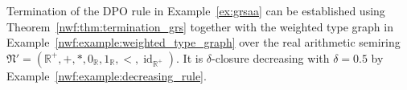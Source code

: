\begin{example}
    \label{nwf:example:termination}
    Termination of the DPO rule in Example~\ref{ex:grsaa} can be established using Theorem~\ref{nwf:thm:termination_grs} together with the weighted type graph in Example~\ref{nwf:example:weighted_type_graph} over the real arithmetic semiring $\mathfrak{N}' = (\mathbb{R}^+,+,*,0_\mathbb{R},1_\mathbb{R},<,\operatorname{id}_{\mathbb{R}^+})$. It is $\delta$-closure decreasing with $\delta = 0.5$ by Example~\ref{nwf:example:decreasing_rule}.
\end{example}

